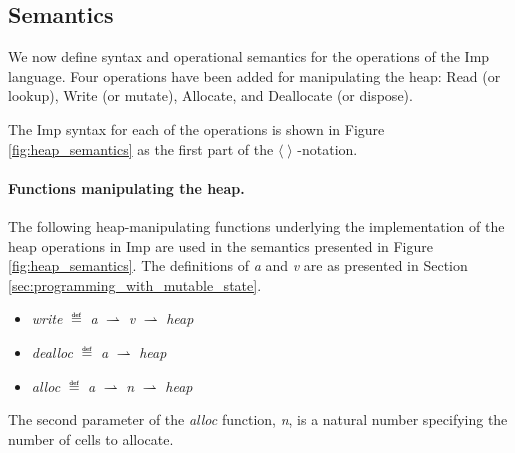 \subsection{Semantics}
\label{sec:semantics}
We now define syntax and operational semantics for the operations of the Imp language. Four operations have been added for manipulating the heap: Read (or lookup), Write (or mutate), Allocate, and Deallocate (or dispose).

The Imp syntax for each of the operations is shown in Figure \ref{fig:heap_semantics} as the first part of the $\langle \; \rangle$  -notation. 
\paragraph{Functions manipulating the heap.}
The following heap-manipulating functions underlying the implementation of the heap operations in Imp are used in the semantics presented in Figure \ref{fig:heap_semantics}. The definitions of {\it a} and {\it v} are as presented in Section \ref{sec:programming_with_mutable_state}.
\begin{itemize}
\item {\it write} $\eqdef$ {\it a} $\rightharpoonup$ {\it v} $\rightharpoonup$ {\it heap}
\item {\it dealloc} $\eqdef$ {\it a} $\rightharpoonup$ {\it heap}
\item {\it alloc} $\eqdef$ {\it a} $\rightharpoonup$ {\it n} $\rightharpoonup$ {\it heap}
\end{itemize}
The second parameter of the {\it alloc} function, {\it n}, is a natural number specifying the number of cells to allocate.

